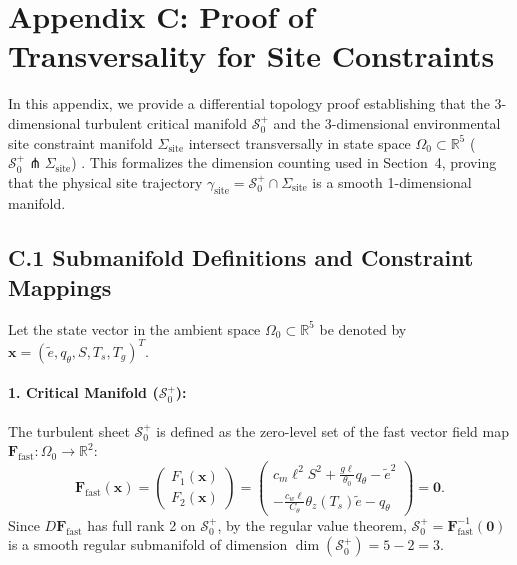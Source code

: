 \section*{Appendix C: Proof of Transversality for Site Constraints}
\label{app:transversality}

In this appendix, we provide a differential topology proof establishing that the 3-dimensional turbulent critical manifold $\mathcal{S}_0^+$ and the 3-dimensional environmental site constraint manifold $\Sigma_{\mathrm{site}}$ intersect transversally in state space $\Omega_0 \subset \mathbb{R}^5$ ($\mathcal{S}_0^+ \pitchfork \Sigma_{\mathrm{site}}$) \citep{GuilleminPollack1974, Hirsch1976}. This formalizes the dimension counting used in Section~4, proving that the physical site trajectory $\gamma_{\mathrm{site}} = \mathcal{S}_0^+ \cap \Sigma_{\mathrm{site}}$ is a smooth 1-dimensional manifold.

\subsection*{C.1 Submanifold Definitions and Constraint Mappings}

Let the state vector in the ambient space $\Omega_0 \subset \mathbb{R}^5$ be denoted by $\mathbf{x} = (\tilde e, q_\theta, S, T_s, T_g)^T$.

\paragraph{1. Critical Manifold ($\mathcal{S}_0^+$):}
The turbulent sheet $\mathcal{S}_0^+$ is defined as the zero-level set of the fast vector field map $\mathbf{F}_{\mathrm{fast}} : \Omega_0 \to \mathbb{R}^2$:
\begin{equation}
\mathbf{F}_{\mathrm{fast}}(\mathbf{x}) =
\begin{pmatrix}
F_1(\mathbf{x}) \\[4pt]
F_2(\mathbf{x})
\end{pmatrix}
=
\begin{pmatrix}
c_m \ell^2 S^2 + \frac{g \ell}{\theta_0} q_\theta - \tilde e^2 \\[6pt]
-\frac{c_w \ell}{C_\theta}\theta_z(T_s)\tilde e - q_\theta
\end{pmatrix}
= \mathbf{0}.
\end{equation}
Since $D\mathbf{F}_{\mathrm{fast}}$ has full rank 2 on $\mathcal{S}_0^+$, by the regular value theorem, $\mathcal{S}_0^+ = \mathbf{F}_{\mathrm{fast}}^{-1}(\mathbf{0})$ is a smooth regular submanifold of dimension $\dim(\mathcal{S}_0^+) = 5 - 2 = 3$.

